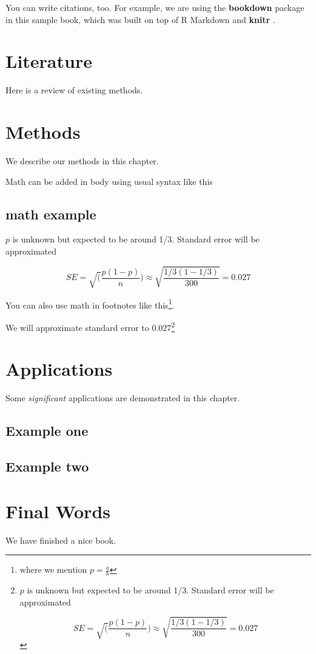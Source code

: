 \documentclass[
]{book}
\begin{document}
You can write citations, too. For example, we are using the \textbf{bookdown} package \citep{R-bookdown} in this sample book, which was built on top of R Markdown and \textbf{knitr} \citep{xie2015}.

\hypertarget{literature}{%
\chapter{Literature}\label{literature}}

Here is a review of existing methods.

\hypertarget{methods}{%
\chapter{Methods}\label{methods}}

We describe our methods in this chapter.

Math can be added in body using usual syntax like this

\hypertarget{math-example}{%
\section{math example}\label{math-example}}

\(p\) is unknown but expected to be around 1/3. Standard error will be approximated

\[
SE = \sqrt(\frac{p(1-p)}{n}) \approx \sqrt{\frac{1/3 (1 - 1/3)} {300}} = 0.027
\]

You can also use math in footnotes like this\footnote{where we mention \(p = \frac{a}{b}\)}.

We will approximate standard error to 0.027\footnote{\(p\) is unknown but expected to be around 1/3. Standard error will be approximated

  \[
  SE = \sqrt(\frac{p(1-p)}{n}) \approx \sqrt{\frac{1/3 (1 - 1/3)} {300}} = 0.027
  \]}

\hypertarget{applications}{%
\chapter{Applications}\label{applications}}

Some \emph{significant} applications are demonstrated in this chapter.

\hypertarget{example-one}{%
\section{Example one}\label{example-one}}

\hypertarget{example-two}{%
\section{Example two}\label{example-two}}

\hypertarget{final-words}{%
\chapter{Final Words}\label{final-words}}

We have finished a nice book.

  
\end{document}
